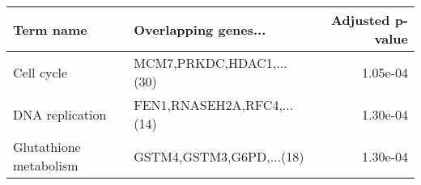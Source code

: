 \begin{tabular}{llr}
\toprule
             Term name &       Overlapping genes... &  Adjusted p-value \\
\midrule
            Cell cycle &   MCM7,PRKDC,HDAC1,...(30) &          1.05e-04 \\
       DNA replication & FEN1,RNASEH2A,RFC4,...(14) &          1.30e-04 \\
Glutathione metabolism &   GSTM4,GSTM3,G6PD,...(18) &          1.30e-04 \\
\bottomrule
\end{tabular}
